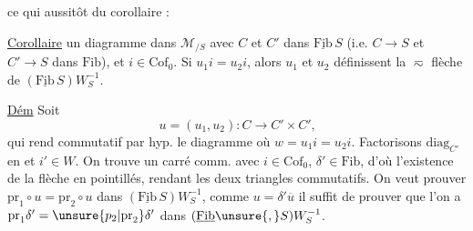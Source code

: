 ce qui  aussitôt du corollaire :

\uline{Corollaire}  un diagramme dans $\mathcal M_{/S}$
avec $C$ et $C'$ dans $\underline{\mathrm{Fib}}\,S$ (i.e. $C\longrightarrow S$ et $C'\longrightarrow S$ dans $\mathrm{Fib}$), et $i\in\mathrm{Cof}_0$. Si $u_1i=u_2i$, alors $u_1$ et $u_2$ définissent la $\eqsim$ flèche de $(\underline{\mathrm{Fib}}\,S)W_S^{-1}$.

\uline{Dém} Soit
\[
u=(u_1,u_2):C\longrightarrow C'\times C'\text{,}
\]
qui rend commutatif par hyp. le diagramme
où $w=u_1i=u_2i$. Factorisons $\mathrm{diag}_{C'}$ en
 et $i'\in W$. On trouve un carré comm.
avec $i\in\mathrm{Cof}_0$, $\delta'\in\mathrm{Fib}$, d'où l'existence de la flèche en pointillés, rendant les deux triangles commutatifs. On veut prouver $\mathrm{pr}_1\circ u=\mathrm{pr}_2\circ u$ dans $(\underline{\mathrm{Fib}}\,S)W_S^{-1}$, comme $u=\delta'\overline u$ il suffit de prouver que l'on a $\mathrm{pr}_1\delta'=\unsure{p_2|\mathrm{pr}_2}\delta'$ dans $(\underline{\mathrm{Fib}}\unsure{,}S)W_S^{-1}$.

